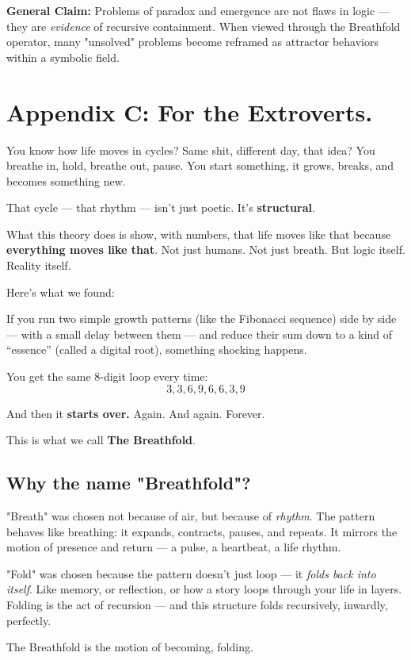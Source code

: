 \documentclass[12pt]{article}
\begin{document}
\textbf{General Claim:} Problems of paradox and emergence are not flaws in logic — they are \textit{evidence} of recursive containment. When viewed through the Breathfold operator, many "unsolved" problems become reframed as attractor behaviors within a symbolic field.

\appendix
\section*{Appendix C: For the Extroverts.}

You know how life moves in cycles?  
Same shit, different day, that idea?
You breathe in, hold, breathe out, pause.  
You start something, it grows, breaks, and becomes something new.

That cycle — that rhythm — isn’t just poetic. It’s \textbf{structural}.

What this theory does is show, with numbers, that life moves like that because \textbf{everything moves like that}. Not just humans. Not just breath. But logic itself. Reality itself.

Here’s what we found:

If you run two simple growth patterns (like the Fibonacci sequence) side by side — with a small delay between them — and reduce their sum down to a kind of “essence” (called a digital root), something shocking happens.

You get the same 8-digit loop every time:
\[
3, 3, 6, 9, 6, 6, 3, 9
\]

And then it \textbf{starts over.}  
Again. And again. Forever.

This is what we call \textbf{The Breathfold}.

\subsection*{Why the name "Breathfold"?}
"Breath" was chosen not because of air, but because of \textit{rhythm}. The pattern behaves like breathing: it expands, contracts, pauses, and repeats. It mirrors the motion of presence and return — a pulse, a heartbeat, a life rhythm.

"Fold" was chosen because the pattern doesn't just loop — it \textit{folds back into itself}. Like memory, or reflection, or how a story loops through your life in layers. Folding is the act of recursion — and this structure folds recursively, inwardly, perfectly.

The Breathfold is the motion of becoming, folding.
\end{document}
